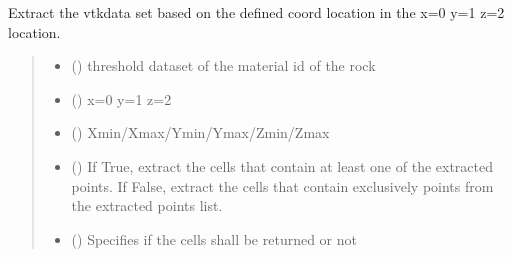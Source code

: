 \documentclass[letterpaper,10pt,english]{sphinxmanual}
\begin{document}
\begin{fulllineitems}
\begin{fulllineitems}
\end{fulllineitems}


\begin{fulllineitems}
\label{\detokenize{openfdem:openfdem.openfdem.Model.extract_based_coord}}
\pysigstartsignatures
{}
\pysigstopsignatures
\sphinxAtStartPar
Extract the vtkdata set based on the defined coord location in the x=0 y=1 z=2 location.
\begin{quote}\begin{description}
\begin{itemize}
\item {} 
\sphinxAtStartPar
{} () \textendash{} threshold dataset of the material id of the rock

\item {} 
\sphinxAtStartPar
{} () \textendash{} x=0 y=1 z=2

\item {} 
\sphinxAtStartPar
{} () \textendash{} Xmin/Xmax/Ymin/Ymax/Zmin/Zmax

\item {} 
\sphinxAtStartPar
{} () \textendash{} If True, extract the cells that contain at least one of the extracted points. If False, extract the cells that contain exclusively points from the extracted points list.

\item {} 
\sphinxAtStartPar
{} () \textendash{} Specifies if the cells shall be returned or not


\end{itemize}
\end{description}
\end{quote}
\end{fulllineitems}
\end{fulllineitems}
\end{document}
